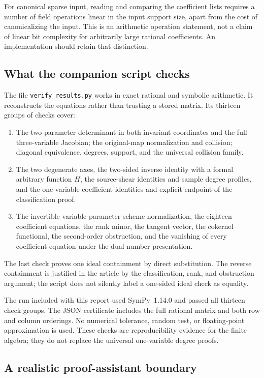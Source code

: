 \documentclass[11pt,a4paper]{article}
\numberwithin{equation}{section}
\theoremstyle{definition}
\theoremstyle{remark}
\begin{document}
For canonical sparse input, reading and comparing the coefficient lists
requires a number of field operations linear in the input support size,
apart from the cost of canonicalizing the input. This is an arithmetic
operation statement, not a claim of linear bit complexity for arbitrarily
large rational coefficients. An implementation should retain that distinction.

\subsection{What the companion script checks}

The file \texttt{verify\_results.py} works in exact rational and symbolic
arithmetic. It reconstructs the equations rather than trusting a stored
matrix. Its thirteen groups of checks cover:
\begin{enumerate}[label=\arabic*.]
\item The two-parameter determinant in both invariant coordinates and the
full three-variable Jacobian; the original-map normalization and collision;
diagonal equivalence, degrees, support, and the universal collision family.
\item The two degenerate axes, the two-sided inverse identity with a formal
arbitrary function $H$, the source-shear identities and sample degree
profiles, and the one-variable coefficient identities and explicit endpoint
of the classification proof.
\item The invertible variable-parameter scheme normalization, the eighteen
coefficient equations, the rank minor, the tangent
vector, the cokernel functional, the second-order obstruction, and the
vanishing of every coefficient equation under the dual-number presentation.
\end{enumerate}
The last check proves one ideal containment by direct substitution. The
reverse containment is justified in the article by the classification,
rank, and obstruction argument; the script does not silently label a
one-sided ideal check as equality.

The run included with this report used SymPy~1.14.0 and passed all thirteen
check groups. The JSON certificate includes the full rational matrix and
both row and column orderings. No numerical tolerance, random test, or
floating-point approximation is used. These checks are reproducibility
evidence for the finite algebra; they do not replace the universal
one-variable degree proofs.

\subsection{A realistic proof-assistant boundary}
\end{document}
